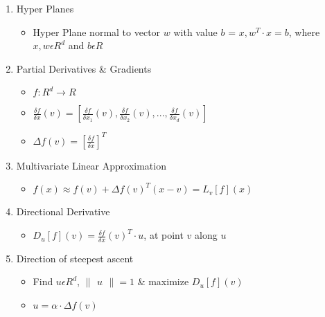 \documentclass[a4paper]{article}
\begin{document}
\begin{enumerate}
\begin{itemize}
		\end{itemize}
		\item Hyper Planes
		\begin{itemize}
			\item Hyper Plane normal to vector $w$ with value $b$ = ${x, w^{T}\cdot x = b}$, where $x, w\epsilon R^{d}$ and $b\epsilon R$
		\end{itemize}
		\item Partial Derivatives \& Gradients
		\begin{itemize}
			\item $f:R^{d}\rightarrow R$
			\item $\frac{\delta f}{\delta x}(v) = [\frac{\delta f}{\delta x_{1}}(v), \frac{\delta f}{\delta x_{2}}(v),...,\frac{\delta f}{\delta x_{d}}(v)]$
			\item $\Delta f(v) = [\frac{\delta f}{\delta x}]^{T}$
		\end{itemize}
		\item Multivariate Linear Approximation
		\begin{itemize}
			\item $f(x)\approx f(v) + \Delta f(v)^{T}(x - v) = L_{v}[f](x)$
		\end{itemize}
		\item Directional Derivative
		\begin{itemize}
			\item $D_u[f](v) = \frac{\delta f}{\delta x}(v)^{T}\cdot u$, at point $v$ along $u$
		\end{itemize}
		\item Direction of steepest ascent
		\begin{itemize}
			\item Find $u\epsilon R^{d}$, $\begin{Vmatrix} u \end{Vmatrix} = 1$ \& maximize $D_{u}[f](v)$
			\item $u = \alpha \cdot \Delta f(v)$
		\end{itemize}
	\end{enumerate}
\end{document}

